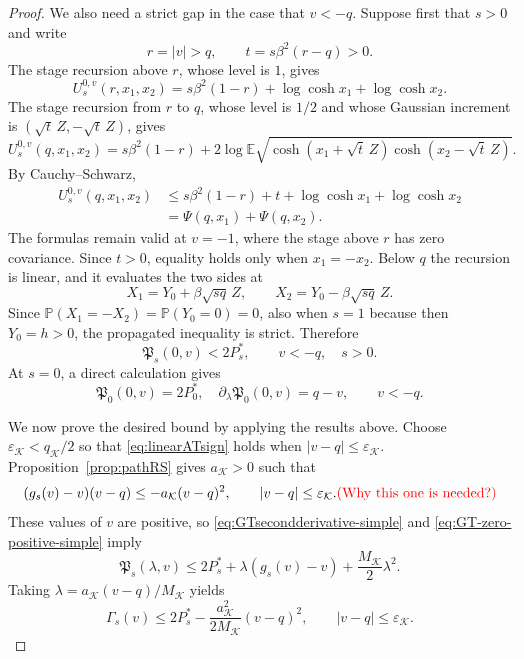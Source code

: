 \documentclass[11pt]{article}
\numberwithin{equation}{section}
\newcommand{\E}{\mathbb{E}}
\newcommand{\Pbb}{\mathbb{P}}
\newcommand{\1}{\mathbf 1}
\newcommand{\cK}{\mathcal K}
\begin{document}
\begin{proof}
We also need a strict gap in the case that $v<-q$.  Suppose first that $s>0$ and
write
\[
 r=|v|>q,
 \qquad
 t=s\beta^2(r-q)>0.
\]
The stage recursion above $r$, whose level is $1$, gives
\[
 U_s^{0,v}(r,x_1,x_2)
 =s\beta^2(1-r)+\log\cosh x_1+\log\cosh x_2.
\]
The stage recursion from $r$ to $q$, whose level is $1/2$ and whose
Gaussian increment is $(\sqrt t\,Z,-\sqrt t\,Z)$, gives
\[
 U_s^{0,v}(q,x_1,x_2)
 =
 s\beta^2(1-r)
 +2\log\E\sqrt{
   \cosh(x_1+\sqrt t\,Z)\cosh(x_2-\sqrt t\,Z)}.
\]
By Cauchy--Schwarz,
\begin{align*}
 U_s^{0,v}(q,x_1,x_2)
 &\le
 s\beta^2(1-r)+t
 +\log\cosh x_1+\log\cosh x_2\\
 &=\Psi(q,x_1)+\Psi(q,x_2).
\end{align*}
The formulas remain valid at $v=-1$, where the stage above $r$ has
zero covariance.  Since $t>0$, equality holds only when
$x_1=-x_2$.  Below $q$ the recursion is
linear, and it evaluates the two sides at
\[
 X_1=Y_0+\beta\sqrt{sq}\,Z,
 \qquad
 X_2=Y_0-\beta\sqrt{sq}\,Z.
\]
Since $\Pbb(X_1=-X_2)=\Pbb(Y_0=0)=0$, also when $s=1$ because then
$Y_0=h>0$, the propagated inequality is strict.  Therefore
\begin{equation}
 \mathfrak P_s(0,v)<2P_s^*,
 \qquad v<-q,\quad s>0.
 \label{eq:GT-negative-strict-simple}
\end{equation}
At $s=0$, a direct calculation gives
\begin{equation}
 \mathfrak P_0(0,v)=2P_0^*,
 \quad
 \partial_\lambda\mathfrak P_0(0,v)=q-v, \qquad v<-q.
 \label{eq:GT-szero-simple}
\end{equation}

We now prove the desired bound by applying the results above.
Choose
$\varepsilon_{\cK}<q_{\cK}/2$ so that
\eqref{eq:linearATsign} holds when
$|v-q|\le\varepsilon_{\cK}$.  Proposition~\ref{prop:pathRS} gives
$a_{\cK}>0$ such that
\begin{equation}
 (g_s(v)-v)(v-q)
 \le-a_{\cK}(v-q)^2,
 \qquad |v-q|\le\varepsilon_{\cK}.
 \label{eq:GT-local-slope-simple} {\color{red}\mbox{(Why this one is needed?)}}
\end{equation}
These values of $v$ are positive, so
\eqref{eq:GTsecondderivative-simple} and \eqref{eq:GT-zero-positive-simple} imply
\[
 \mathfrak P_s(\lambda,v)
 \le
 2P_s^*+\lambda(g_s(v)-v)
 +\frac{M_{\cK}}2\lambda^2.
\]
Taking $\lambda=a_{\cK}(v-q)/M_{\cK}$ yields
\begin{equation}
 \Gamma_s(v)
 \le
 2P_s^*
 -\frac{a_{\cK}^2}{2M_{\cK}}(v-q)^2,
 \qquad |v-q|\le\varepsilon_{\cK}.
 \label{eq:GT-local-coercivity-simple}
\end{equation}


\end{proof}
\end{document}
